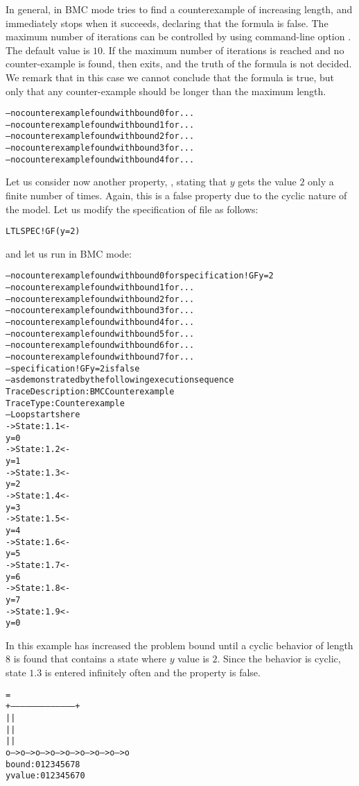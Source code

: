 In general, in BMC mode \nusmv tries to find a counterexample of
increasing length, and immediately stops when it succeeds, declaring
that the formula is false. The maximum number of iterations can be
controlled by using command-line option .  The default
value is $10$. 
If the maximum number of iterations is reached and no counter-example is
found, then \nusmv exits, and the truth of the formula is not
decided. We remark that in this case we cannot conclude that the formula is true,
but only that any counter-example should be longer than the maximum length.
\begin{alltt}
\shellprompt {}
-- no counterexample found with bound 0 for ...
-- no counterexample found with bound 1 for ...
-- no counterexample found with bound 2 for ...
-- no counterexample found with bound 3 for ...
-- no counterexample found with bound 4 for ...
\shellprompt 
\end{alltt}

Let us consider now another property, , stating that
$y$ gets the value $2$ only a finite number of times. Again, this is a false
property due to the cyclic nature of the model. Let us modify the
specification of file  as follows:
\begin{alltt}
LTLSPEC !G F (y = 2)
\end{alltt}
and let us run \nusmv in BMC mode:
\begin{alltt}
\shellprompt {}
-- no counterexample found with bound 0 for specification ! G  F y = 2
-- no counterexample found with bound 1 for ...
-- no counterexample found with bound 2 for ...
-- no counterexample found with bound 3 for ...
-- no counterexample found with bound 4 for ...
-- no counterexample found with bound 5 for ...
-- no counterexample found with bound 6 for ...
-- no counterexample found with bound 7 for ...
-- specification ! G  F y = 2   is false
-- as demonstrated by the following execution sequence
Trace Description: BMC Counterexample
Trace Type: Counterexample
-- Loop starts here
-> State: 1.1 <-
  y = 0
-> State: 1.2 <-
  y = 1
-> State: 1.3 <-
  y = 2
-> State: 1.4 <-
  y = 3
-> State: 1.5 <-
  y = 4
-> State: 1.6 <-
  y = 5
-> State: 1.7 <-
  y = 6
-> State: 1.8 <-
  y = 7
-> State: 1.9 <-
  y = 0
\shellprompt
\end{alltt}
In this example \nusmv has increased the problem bound until a
cyclic behavior of length 8 is found that contains a state where $y$ value
is $2$. Since the behavior is cyclic, state $1.3$ is entered infinitely
often and the property is false.
\begin{alltt}
                             =
         +---------------------------------------+
         |                                       |
         |                                       |
         |                                       |
         o--->o--->o--->o--->o--->o--->o--->o--->o
bound:   0    1    2    3    4    5    6    7    8
y value: 0    1    2    3    4    5    6    7    0
\end{alltt}


